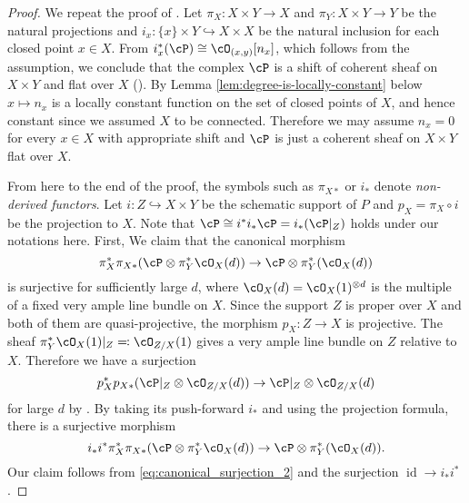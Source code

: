 \documentclass[12pt]{amsart}
\numberwithin{equation}{section}
\theoremstyle{plain}
\theoremstyle{definition}
\DeclareMathOperator{\id}{\mathrm{id}}
\begin{document}
\begin{proof}
    We repeat the proof of \cite[Lemma 2.14]{MR2155085}.
    Let $\pi_X \colon X \times Y \to X$ and $\pi_Y \colon X \times Y \to Y$ be the natural projections and $i_x \colon \{x\} \times Y \hookrightarrow X \times X$ be the natural inclusion for each closed point $x \in X$.
    From $i_x^*(\cP) \cong \cO_{(x, y)}[n_x]$, which follows from the assumption, we conclude that the complex $\cP$ is a shift of coherent sheaf on $X \times Y$ and flat over $X$ (\cite[Lemma 4.3]{MR1651025}).
    By Lemma \ref{lem:degree-is-locally-constant} below $x \mapsto n_x$ is a locally constant function on the set of closed points of $X$,
    and hence constant since we assumed $X$ to be connected.
    Therefore we may assume $n_x=0$ for every $x \in X$ with appropriate shift and $\cP$ is just a coherent sheaf on $X \times Y$ flat over $X$.

    From here to the end of the proof, the symbols such as $\pi_{X*}$ or $i_*$ denote \emph{non-derived functors}.
    Let $i \colon Z \hookrightarrow X \times Y$ be the schematic support of $P$ and $p_X = \pi_X \circ i$ be the projection to $X$.
    Note that $\cP \cong i^*i_* \cP = i_*(\cP\vert_Z)$ holds under our notations here.
    First, We claim that the canonical morphism
    \begin{equation}\label{eq:canonical_surjection}
        \pi_X^* \pi_{X*}(\cP \otimes \pi_Y^*\cO_X(d)) \to \cP \otimes \pi_Y^*(\cO_X(d))
    \end{equation}
    is surjective for sufficiently large $d$, where $\cO_X(d) = \cO_X(1)^{\otimes d}$ is the multiple of a fixed very ample line bundle on $X$.
    Since the support $Z$ is proper over $X$ and both of them are quasi-projective, the morphism $p_X \colon Z \to X$ is projective. The sheaf $\pi_Y^*\cO_X(1)\vert_Z \eqqcolon \cO_{Z/X}(1)$ gives a very ample line bundle on $Z$ relative to $X$. Therefore we have a surjection
    \begin{equation}
        p_X^* p_{X*}(\cP\vert_Z \otimes \cO_{Z/X}(d)) \to \cP\vert_Z \otimes \cO_{Z/X}(d)
    \end{equation}
    for large $d$ by \cite[Theorem III 8.8]{MR0463157}.
    By taking its push-forward $i_*$ and using the projection formula, there is a surjective morphism
    \begin{equation}\label{eq:canonical_surjection_2}
        i_*i^*\pi_X^* \pi_{X*}(\cP \otimes \pi_Y^*\cO_X(d)) \to \cP \otimes \pi_Y^*(\cO_X(d)).
    \end{equation}
    Our claim follows from \eqref{eq:canonical_surjection_2} and the surjection $\id \to i_*i^*$.



\end{proof}
\end{document}
